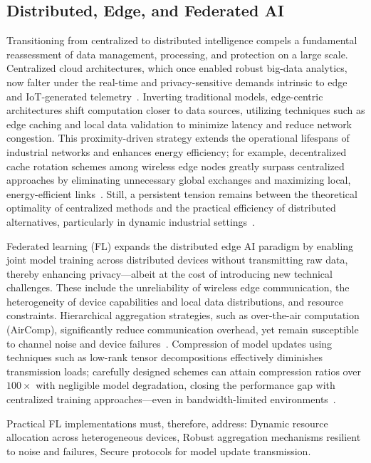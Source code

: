 \documentclass[sigconf]{acmart}
\begin{document}
\subsection{Distributed, Edge, and Federated AI}

Transitioning from centralized to distributed intelligence compels a fundamental reassessment of data management, processing, and protection on a large scale. Centralized cloud architectures, which once enabled robust big-data analytics, now falter under the real-time and privacy-sensitive demands intrinsic to edge and IoT-generated telemetry~\cite{ref10,ref11}. Inverting traditional models, edge-centric architectures shift computation closer to data sources, utilizing techniques such as edge caching and local data validation to minimize latency and reduce network congestion. This proximity-driven strategy extends the operational lifespans of industrial networks and enhances energy efficiency; for example, decentralized cache rotation schemes among wireless edge nodes greatly surpass centralized approaches by eliminating unnecessary global exchanges and maximizing local, energy-efficient links~\cite{ref11}. Still, a persistent tension remains between the theoretical optimality of centralized methods and the practical efficiency of distributed alternatives, particularly in dynamic industrial settings~\cite{ref10,ref11}.

Federated learning (FL) expands the distributed edge AI paradigm by enabling joint model training across distributed devices without transmitting raw data, thereby enhancing privacy—albeit at the cost of introducing new technical challenges. These include the unreliability of wireless edge communication, the heterogeneity of device capabilities and local data distributions, and resource constraints. Hierarchical aggregation strategies, such as over-the-air computation (AirComp), significantly reduce communication overhead, yet remain susceptible to channel noise and device failures~\cite{ref23}. Compression of model updates using techniques such as low-rank tensor decompositions effectively diminishes transmission loads; carefully designed schemes can attain compression ratios over $100\times$ with negligible model degradation, closing the performance gap with centralized training approaches—even in bandwidth-limited environments~\cite{ref23}.

Practical FL implementations must, therefore, address:
Dynamic resource allocation across heterogeneous devices,
Robust aggregation mechanisms resilient to noise and failures,
Secure protocols for model update transmission.
\end{document}
